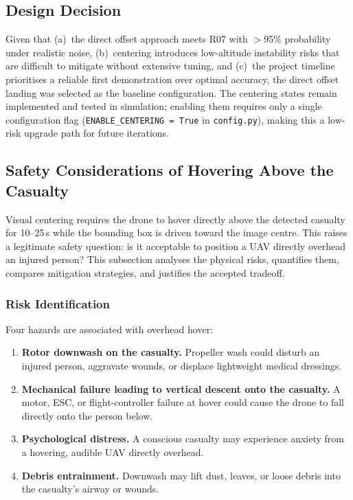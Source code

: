 \subsection{Design Decision}

Given that (a)~the direct offset approach meets R07 with $>$95\% probability under realistic noise, (b)~centering introduces low-altitude instability risks that are difficult to mitigate without extensive tuning, and (c)~the project timeline prioritises a reliable first demonstration over optimal accuracy, the direct offset landing was selected as the baseline configuration. The centering states remain implemented and tested in simulation; enabling them requires only a single configuration flag (\texttt{ENABLE\_CENTERING = True} in \texttt{config.py}), making this a low-risk upgrade path for future iterations.

\subsection{Safety Considerations of Hovering Above the Casualty}\label{sec:hover-safety}

Visual centering requires the drone to hover directly above the detected casualty for 10--25\,s while the bounding box is driven toward the image centre. This raises a legitimate safety question: is it acceptable to position a UAV directly overhead an injured person? This subsection analyses the physical risks, quantifies them, compares mitigation strategies, and justifies the accepted tradeoff.

\subsubsection{Risk Identification}

Four hazards are associated with overhead hover:

\begin{enumerate}
    \item \textbf{Rotor downwash on the casualty.} Propeller wash could disturb an injured person, aggravate wounds, or displace lightweight medical dressings.
    \item \textbf{Mechanical failure leading to vertical descent onto the casualty.} A motor, ESC, or flight-controller failure at hover could cause the drone to fall directly onto the person below.
    \item \textbf{Psychological distress.} A conscious casualty may experience anxiety from a hovering, audible UAV directly overhead.
    \item \textbf{Debris entrainment.} Downwash may lift dust, leaves, or loose debris into the casualty's airway or wounds.
\end{enumerate}

